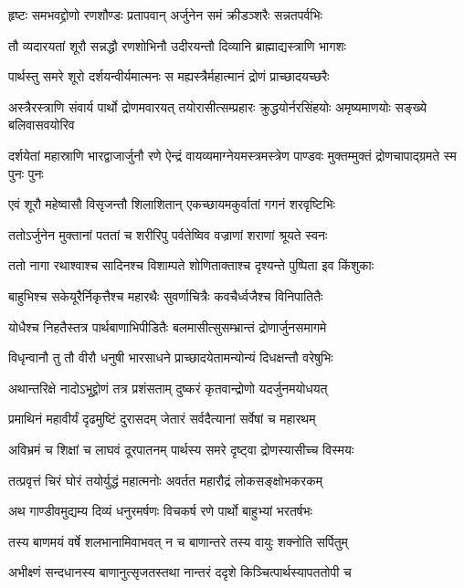\twolineshloka
{हृष्टः समभवद्द्रोणो रणशौण्डः प्रतापवान्}
{अर्जुनेन समं क्रीडञ्शरैः सन्नतपर्वभिः}


\twolineshloka
{तौ व्यदारयतां शूरौ सन्नद्धौ रणशोभिनौ}
{उदीरयन्तौ दिव्यानि ब्राह्माद्यस्त्राणि भागशः}


\twolineshloka
{पार्थस्तु समरे शूरो दर्शयन्वीर्यमात्मनः}
{स मह्यस्त्रैर्महात्मानं द्रोणं प्राच्छादयच्छरैः}


\onelineshloka
{अस्त्रैरस्त्राणि संवार्य पार्थो द्रोणमवारयत्}
\twolineshloka
{तयोरासीत्सम्प्रहारः क्रुद्धयोर्नरसिंहयोः}
{अमृष्यमाणयोः सङ्ख्ये बलिवासवयोरिव}


\onelineshloka
{दर्शयेतां महास्राणि भारद्वाजार्जुनौ रणे}
\twolineshloka
{ऐन्द्रं वायव्यमाग्नेयमस्त्रमस्त्रेण पाण्डवः}
{मुक्तम्मुक्तं द्रोणचापाद्ग्रमते स्म पुनः पुनः}


\twolineshloka
{एवं शूरौ महेष्वासौ विसृजन्तौ शिलाशितान्}
{एकच्छायमकुर्वातां गगनं शरवृष्टिभिः}


\twolineshloka
{ततोऽर्जुनेन मुक्तानां पततां च शरीरिपु}
{पर्वतेष्विव वज्राणां शराणां श्रूयते स्वनः}


\twolineshloka
{ततो नागा रथाश्वाश्च सादिनश्च विशाम्पते}
{शोणिताक्ताश्च दृश्यन्ते पुष्पिता इव किंशुकाः}


\twolineshloka
{बाहुभिश्च सकेयूरैर्निकृत्तैश्च महारथैः}
{सुवर्णाचित्रैः कवचैर्ध्वजैश्च विनिपातितैः}


\twolineshloka
{योधैश्च निहतैस्तत्र पार्थबाणाभिपीडितैः}
{बलमासीत्सुसम्भ्रान्तं द्रोणार्जुनसमागमे}


\twolineshloka
{विधृन्वानौ तु तौ वीरौ धनुषी भारसाधने}
{प्राच्छादयेतामन्योन्यं दिधक्षन्तौ वरेषुभिः}


\twolineshloka
{अथान्तरिक्षे नादोऽभूद्द्रोणं तत्र प्रशंसताम्}
{दुष्करं कृतवान्द्रोणो यदर्जुनमयोधयत्}


\twolineshloka
{प्रमाथिनं महावीर्यं दृढमुष्टिं दुरासदम्}
{जेतारं सर्वदैत्यानां सर्वेषां च महारथम्}


\twolineshloka
{अविभ्रमं च शिक्षां च लाघवं दूरपातनम्}
{पार्थस्य समरे दृष्ट्वा द्रोणस्यासीच्च विस्मयः}


\twolineshloka
{तत्प्रवृत्तं चिरं घोरं तयोर्युद्धं महात्मनोः}
{अवर्तत महारौद्रं लोकसङ्क्षोभकरकम्}


\twolineshloka
{अथ गाण्डीवमुद्यम्य दिव्यं धनुरमर्षणः}
{विचकर्ष रणे पार्थो बाहुभ्यां भरतर्षभः}


\twolineshloka
{तस्य बाणमयं वर्षे शलभानामिवाभवत्}
{न च बाणान्तरे तस्य वायुः शक्नोति सर्पितुम्}


\twolineshloka
{अभीक्ष्णं सन्दधानस्य बाणानुत्सृजतस्तथा}
{नान्तरं ददृशे किञ्चित्पार्थस्यापततोपी च}


